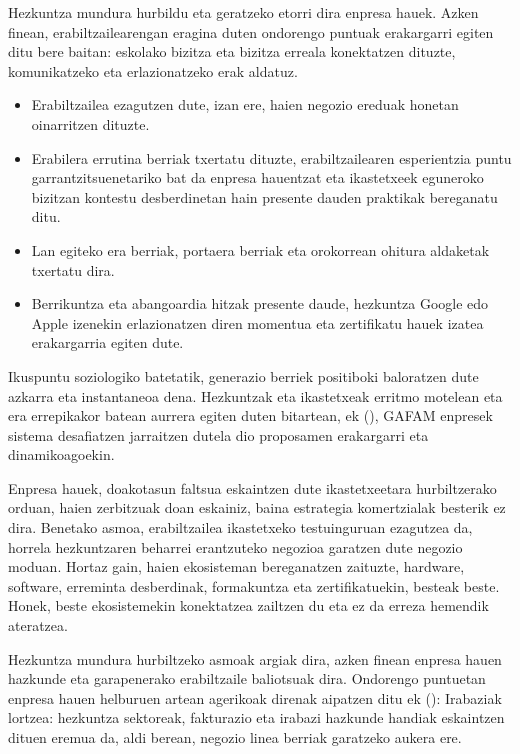 Hezkuntza mundura hurbildu eta geratzeko etorri dira enpresa hauek. Azken finean, erabiltzailearengan eragina duten ondorengo puntuak erakargarri egiten ditu bere baitan: eskolako bizitza eta bizitza erreala konektatzen dituzte, komunikatzeko eta erlazionatzeko erak aldatuz.

\begin{itemize}
    \item Erabiltzailea ezagutzen dute, izan ere, haien negozio ereduak honetan oinarritzen dituzte.
    \item Erabilera errutina berriak txertatu dituzte, erabiltzailearen esperientzia puntu garrantzitsuenetariko bat da enpresa hauentzat eta ikastetxeek eguneroko bizitzan kontestu desberdinetan hain presente dauden praktikak bereganatu ditu. 
    \item Lan egiteko era berriak, portaera berriak eta orokorrean ohitura aldaketak txertatu dira.
    \item Berrikuntza eta abangoardia hitzak presente daude, hezkuntza Google edo Apple izenekin erlazionatzen diren momentua eta zertifikatu hauek izatea erakargarria egiten dute.
\end{itemize}

Ikuspuntu soziologiko batetatik, generazio berriek positiboki baloratzen dute azkarra eta instantaneoa dena. Hezkuntzak eta ikastetxeak erritmo motelean eta era errepikakor batean aurrera egiten duten bitartean, \citeauthor{herranz2018gafam}ek (\citeyear{herranz2018gafam}), GAFAM enpresek sistema desafiatzen jarraitzen dutela dio proposamen erakargarri eta dinamikoagoekin.

Enpresa hauek, doakotasun faltsua eskaintzen dute ikastetxeetara hurbiltzerako orduan, haien zerbitzuak doan eskainiz, baina estrategia komertzialak besterik ez dira. Benetako asmoa, erabiltzailea ikastetxeko testuinguruan ezagutzea da, horrela hezkuntzaren beharrei erantzuteko negozioa garatzen dute negozio moduan. Hortaz gain, haien ekosisteman bereganatzen zaituzte, hardware, software, erreminta desberdinak, formakuntza eta zertifikatuekin, besteak beste. Honek, beste ekosistemekin konektatzea zailtzen du eta ez da erreza hemendik ateratzea.

Hezkuntza mundura hurbiltzeko asmoak argiak dira, azken finean enpresa hauen hazkunde eta garapenerako erabiltzaile baliotsuak dira. Ondorengo puntuetan enpresa hauen helburuen artean agerikoak direnak aipatzen ditu \citeauthor{herranz2018gafam}ek (\citeyear{herranz2018gafam}): Irabaziak lortzea: hezkuntza sektoreak, fakturazio eta irabazi hazkunde handiak eskaintzen dituen eremua da, aldi berean, negozio linea berriak garatzeko aukera ere.

